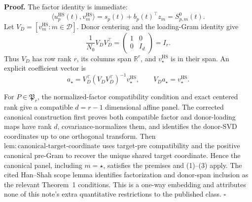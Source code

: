\textbf{Proof.}
The factor identity is immediate:
\[
 \langle u_p^{\mathrm{HS}}(t),v_m^{\mathrm{HS}}\rangle
 =s_p(t)+b_p(t)^\top z_m=S^0_{p,m}(t).                    \tag{1}
\]
Let \(V_D=[v_m^{\mathrm{HS}}:m\in\mathcal D]\). Donor centering and the loading-Gram identity give
\[
 \frac1{N_0}V_DV_D^\top
 =\begin{pmatrix}1&0\\0&I_d\end{pmatrix}=I_r.             \tag{2}
\]
Thus \(V_D\) has row rank \(r\), its columns span \(\mathbb R^r\), and \(v_\star^{\mathrm{HS}}\) is in their span. An explicit coefficient vector is
\[
 a_\star=V_D^\top(V_DV_D^\top)^{-1}v_\star^{\mathrm{HS}},
 \qquad V_Da_\star=v_\star^{\mathrm{HS}}.                \tag{3}
\]

For \(P\in\mathfrak P_r\), the normalized-factor compatibility condition and exact centered rank give a compatible \(d=r-1\) dimensional affine panel. The corrected canonical construction first proves both compatible factor and donor-loading maps have rank \(d\), covariance-normalizes them, and identifies the donor-SVD coordinates up to one orthogonal transform. Then \(\mathrm{lem:canonical\mbox{-}target\mbox{-}coordinate}\) uses target-pre compatibility and the positive canonical pre-Gram to recover the unique shared target coordinate. Hence the canonical panel, including \(m=\star\), satisfies the premises and (1)--(3) apply. The cited Han--Shah scope lemma identifies factorization and donor-span inclusion as the relevant Theorem~1 conditions. This is a one-way embedding and attributes none of this note's extra quantitative restrictions to the published class. \(\square\)